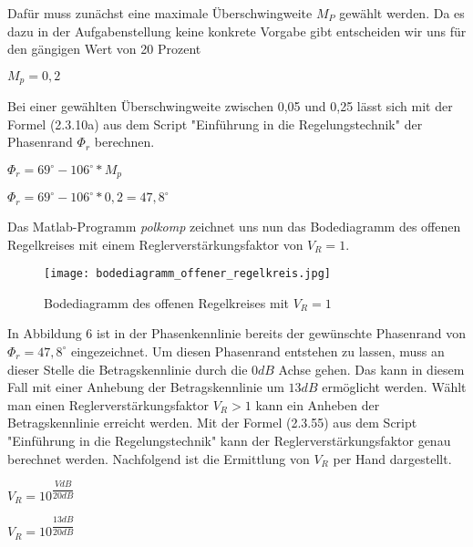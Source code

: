 Dafür muss zunächst eine maximale Überschwingweite $M_{P}$ gewählt werden. Da es dazu in der Aufgabenstellung keine konkrete Vorgabe gibt entscheiden wir uns für den gängigen Wert von 20 Prozent

\begin{center}
$ M_{p} = 0,2 $
\end{center}

Bei einer gewählten Überschwingweite zwischen 0,05 und 0,25 lässt sich mit der Formel (2.3.10a) aus dem Script  "Einführung in die Regelungstechnik" der Phasenrand $\Phi_{r}$ berechnen.

\begin{center}
$\Phi_{r}=69^\circ-106^\circ*M_{p}$
\end{center}

\begin{center}
$\Phi_{r}=69^\circ-106^\circ*0,2=47,8^\circ$
\end{center}

\newpage

Das Matlab-Programm \textit{polkomp} zeichnet uns nun das Bodediagramm des offenen Regelkreises mit einem Reglerverstärkungsfaktor von $V_{R}=1$. 

\begin{figure}[h]
	\begin{center}
		\texttt{[image: bodediagramm\_offener\_regelkreis.jpg]}
		\caption{Bodediagramm des offenen Regelkreises mit $V_{R}=1$}
       \label{bode}
	\end{center} 
\end{figure}

In Abbildung 6 ist in der Phasenkennlinie bereits der gewünschte Phasenrand von $\Phi_{r}=47,8^\circ$ eingezeichnet. Um diesen Phasenrand entstehen zu lassen, muss an dieser Stelle die Betragskennlinie durch die $0 dB$ Achse gehen. Das kann in diesem Fall mit einer Anhebung der Betragskennlinie um $13dB$ ermöglicht werden. Wählt man einen Reglerverstärkungsfaktor $V_{R}>1$ kann ein Anheben der Betragskennlinie erreicht werden. Mit der Formel (2.3.55) aus dem Script "Einführung in die Regelungstechnik" kann der Reglerverstärkungsfaktor genau berechnet werden. Nachfolgend ist die Ermittlung von $V_{R}$ per Hand dargestellt.

\begin{center}
$V_{R}=10^{\dfrac{VdB}{20dB}}$
\end{center}

\begin{center}
$V_{R}=10^{\dfrac{13dB}{20dB}}$
\end{center}

